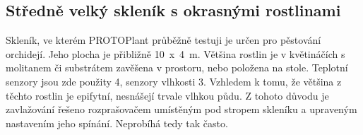 
\begin{table}[h]
    \centering
    \caption{Tabulka s cenovou kalkulací systému pro menší skleník.}
    \label{tab:SmallGreenhousePricing}
\end{table}

\subsection{Středně velký skleník s okrasnými rostlinami}
Skleník, ve kterém PROTOPlant průběžně testuji je určen pro pěstování orchidejí. 
Jeho plocha je přibližně 10~x~4~m.
Většina rostlin je v květináčích s molitanem či substrátem zavěšena v prostoru, nebo položena na stole.
Teplotní senzory jsou zde použity 4, senzory vlhkosti 3.
Vzhledem k tomu, že většina z těchto rostlin je epifytní, nesnášejí trvale vlhkou půdu. 
Z tohoto důvodu je zavlažování řešeno rozprašovačem umístěným pod stropem skleníku a upraveným nastavením jeho spínání.
Neprobíhá tedy tak často.

